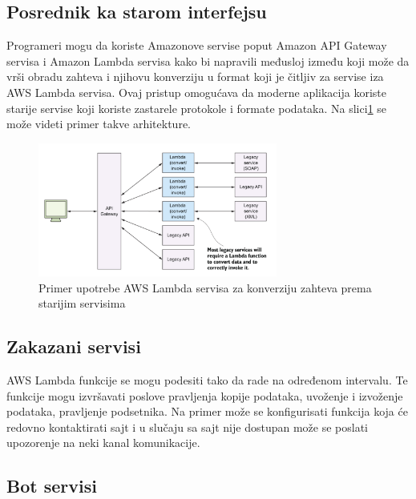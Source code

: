 \documentclass[12pt,oneside]{memoir}
\begin{document}
\subsection{Posrednik ka starom interfejsu} %

Programeri mogu da koriste Amazonove servise poput Amazon API Gateway servisa i Amazon Lambda servisa kako bi napravili međusloj između koji može da vrši obradu zahteva i njihovu konverziju u format koji je čitljiv za servise iza AWS Lambda servisa. Ovaj pristup omogućava da moderne aplikacija koriste starije servise koji koriste zastarele protokole i formate podataka. Na slici\ref{fig:KonverzijaPodataka} se može videti primer takve arhitekture.

\begin{figure}[!ht]
  \centering
  \includegraphics[width=0.7\textwidth]{Slika 9.png}
  \caption{Primer upotrebe AWS Lambda servisa za konverziju zahteva prema starijim servisima}
  \label{fig:KonverzijaPodataka}
\end{figure}

\subsection{Zakazani servisi}

AWS Lambda funkcije se mogu podesiti tako da rade na određenom intervalu. Te funkcije mogu izvršavati poslove pravljenja kopije podataka, uvoženje i izvoženje podataka, pravljenje podsetnika. Na primer može se konfigurisati funkcija koja će redovno kontaktirati sajt i u slučaju sa sajt nije dostupan može se poslati upozorenje na neki kanal komunikacije.

\subsection{Bot servisi}
\end{document}
